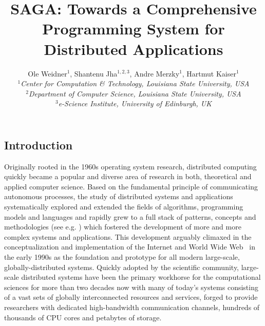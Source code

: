 \documentclass[a4paper,10pt]{article}
\newcommand{\jhanote}[1]{  {\textcolor{red}     { ***Shantenu: #1 }}}
\newcommand{\jhanote}[1]{}
\begin{document}
 \title{ \large \vspace{-3.5em} SAGA: Towards a Comprehensive Programming System for Distributed Applications }
 
 \author{\normalsize Ole Weidner$^{1}$, Shantenu Jha$^{1,2,3}$, Andre Merzky$^{1}$, Hartmut Kaiser$^{1}$ \\
   \small{\emph{$^{1}$Center for Computation \& Technology, Louisiana State University, USA}}\\
   \small{\emph{$^{2}$Department of Computer Science, Louisiana State University, USA}}\\
   \small{\emph{$^{3}$e-Science Institute, University of Edinburgh, UK}}
 }
 \date{}
 \maketitle
 




\subsection*{Introduction}
\vspace{-0.6em}

 Originally rooted in the 1960s operating system research, distributed computing 
 quickly became a popular and diverse area of research in both, theoretical and applied 
 computer science. Based on the fundamental principle of communicating autonomous processes, 
 the study of distributed systems and applications systematically explored and extended the 
 fields of algorithms, programming models and languages and rapidly grew to a full stack of 
 patterns, concepts and methodologies (see e.g. \cite{519301}) which fostered the development 
 of more and more complex systems and applications. This development arguably climaxed in the  
 conceptualization and implementation of the Internet and World Wide Web~\cite{Berners-lee92world-wideweb} 
 in the early 1990s as the foundation and prototype for all modern large-scale, globally-distributed 
 systems. Quickly adopted by the scientific community, large-scale distributed systems have 
 been the primary workhorse for the computational sciences for more than two decades now 
 with many of today's systems consisting of a vast sets of globally interconnected resources 
 and services, forged to provide researchers with dedicated high-bandwidth communication 
 channels, hundreds of thousands of CPU cores and petabytes of storage.
 
\end{document}
